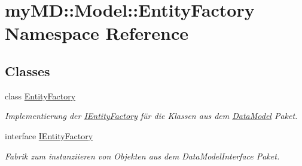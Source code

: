 \hypertarget{namespacemy_m_d_1_1_model_1_1_entity_factory}{
\section{my\-MD::Model::Entity\-Factory Namespace Reference}
\label{d8/dae/namespacemy_m_d_1_1_model_1_1_entity_factory}
}


\subsection*{Classes}
\begin{CompactItemize}
\item 
class \hyperlink{classmy_m_d_1_1_model_1_1_entity_factory_1_1_entity_factory}{Entity\-Factory}
\begin{CompactList}\small\item\em Implementierung der \hyperlink{interfacemy_m_d_1_1_model_1_1_entity_factory_1_1_i_entity_factory}{IEntity\-Factory} f\"{u}r die Klassen aus dem \hyperlink{namespacemy_m_d_1_1_model_1_1_data_model}{Data\-Model} Paket. \item\end{CompactList}\item 
interface \hyperlink{interfacemy_m_d_1_1_model_1_1_entity_factory_1_1_i_entity_factory}{IEntity\-Factory}
\begin{CompactList}\small\item\em Fabrik zum instanziieren von Objekten aus dem Data\-Model\-Interface Paket. \item\end{CompactList}\end{CompactItemize}
